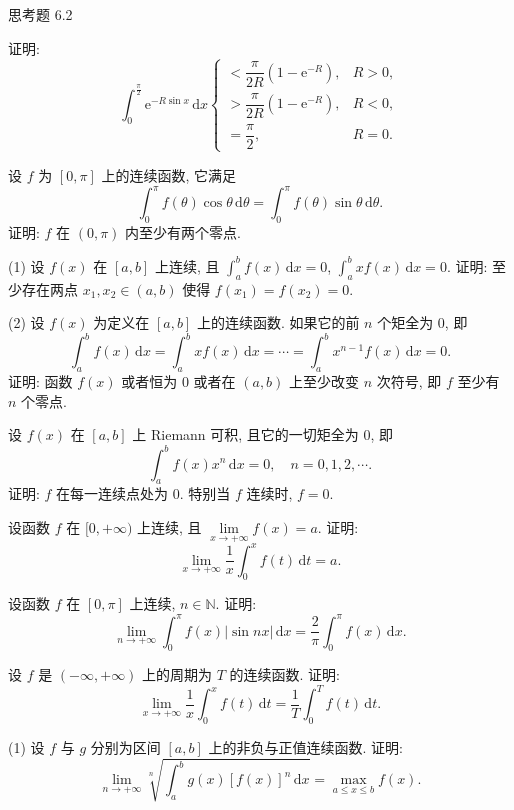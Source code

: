 \begin{exblock}{思考题 6.2}
  \item 证明:
  \[
  \int_{0}^{\frac{\pi}{2}}\mathrm{e}^{-R\sin x}\,\mathrm{d}x
  \begin{cases}<\dfrac{\pi}{2R}(1-\mathrm{e}^{-R}),&R>0,\\[3mm]>\dfrac{\pi}{2R}(1-\mathrm{e}^{-R}),&R<0,\\[3mm]=\dfrac{\pi}{2},&R=0.\end{cases}
\]

  \item 设 $f$ 为 $[0,\pi]$ 上的连续函数, 它满足
  \[
  \int_{0}^{\pi}f(\theta)\cos\theta\,\mathrm{d}\theta=\int_{0}^{\pi}f(\theta)\sin\theta\,\mathrm{d}\theta.
\]
  证明: $f$ 在 $(0,\pi)$ 内至少有两个零点.

  \item (1) 设 $f(x)$ 在 $[a,b]$ 上连续, 且 $\int_{a}^{b}f(x)\,\mathrm{d}x=0$, $\int_{a}^{b}xf(x)\,\mathrm{d}x=0$. 证明: 至少存在两点 $x_{1},x_{2}\in(a,b)$ 使得 $f(x_{1})=f(x_{2})=0$.

  (2) 设 $f(x)$ 为定义在 $[a,b]$ 上的连续函数. 如果它的前 $n$ 个矩全为 $0$, 即
  \[
  \int_{a}^{b}f(x)\,\mathrm{d}x=\int_{a}^{b}xf(x)\,\mathrm{d}x=\cdots=\int_{a}^{b}x^{n-1}f(x)\,\mathrm{d}x=0.
\]
  证明: 函数 $f(x)$ 或者恒为 $0$ 或者在 $(a,b)$ 上至少改变 $n$ 次符号, 即 $f$ 至少有 $n$ 个零点.

  \item 设 $f(x)$ 在 $[a,b]$ 上 Riemann 可积, 且它的一切矩全为 $0$, 即
  \[
  \int_{a}^{b}f(x)x^{n}\,\mathrm{d}x=0,\quad n=0,1,2,\cdots.
\]
  证明: $f$ 在每一连续点处为 $0$. 特别当 $f$ 连续时, $f=0$.

  \item 设函数 $f$ 在 $[0,+\infty)$ 上连续, 且 $\lim\limits_{x\to+\infty}f(x)=a$. 证明:
  \[
  \lim_{x\to+\infty}\frac{1}{x}\int_{0}^{x}f(t)\,\mathrm{d}t=a.
\]

  \item 设函数 $f$ 在 $[0,\pi]$ 上连续, $n\in\mathbb{N}$. 证明:
  \[
  \lim_{n\to+\infty}\int_{0}^{\pi}f(x)|\sin nx|\,\mathrm{d}x=\frac{2}{\pi}\int_{0}^{\pi}f(x)\,\mathrm{d}x.
\]

  \item 设 $f$ 是 $(-\infty,+\infty)$ 上的周期为 $T$ 的连续函数. 证明:
  \[
  \lim_{x\to+\infty}\frac{1}{x}\int_{0}^{x}f(t)\,\mathrm{d}t=\frac{1}{T}\int_{0}^{T}f(t)\,\mathrm{d}t.
\]

  \item (1) 设 $f$ 与 $g$ 分别为区间 $[a,b]$ 上的非负与正值连续函数. 证明:
  \[
  \lim_{n\to+\infty}\sqrt[n]{\int_{a}^{b}g(x)[f(x)]^{n}\,\mathrm{d}x}=\max_{a\leqslant x\leqslant b}f(x).
\]


\end{exblock}
